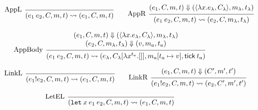 \documentclass[acmsmall,screen,review]{acmart}
\theoremstyle{definition}
\newcommand*{\mem}{m}
\newcommand*{\link}[2]{{#1}\mathtt{!}{#2}}
\newcommand*{\tick}{\mathsf{tick}}
\begin{document}
\begin{figure}[htb]
  \centering
  \footnotesize
  \[
    \begin{prooftree}
      \infer[left label={AppL}]0{
      (e_{1}\:e_{2}, C, \mem, t)
      \rightsquigarrow
      (e_{1},C, \mem,t)
      }
    \end{prooftree}\qquad
    \begin{prooftree}
      \hypo{
        \begin{matrix}
          (e_{1}, C, \mem, t)
          \Downarrow
          (\langle\lambda x.e_{\lambda}, C_{\lambda}\rangle, \mem_{\lambda}, t_{\lambda})
        \end{matrix}
      }
      \infer[left label={AppR}]1{
      (e_{1}\:e_{2}, C, \mem, t)
      \rightsquigarrow
      (e_{2}, C, \mem_{\lambda}, t_{\lambda})
      }
    \end{prooftree}
  \]

  \[
    \begin{prooftree}
      \hypo{
        \begin{matrix}
          (e_{1}, C, \mem, t)
          \Downarrow
          (\langle\lambda x.e_{\lambda}, C_{\lambda}\rangle, \mem_{\lambda}, t_{\lambda}) \\
          (e_{2}, C, \mem_{\lambda}, t_{\lambda})
          \Downarrow
          (v, \mem_{a}, t_{a})
        \end{matrix}
      }
      \infer[left label={AppBody}]1{
      (e_{1}\:e_{2}, C, \mem, t)
      \rightsquigarrow
      (e_{\lambda}, C_{\lambda}[\lambda x^{t_{a}}.[]], \mem_{a}[t_{a}\mapsto v], \tick\:t_{a})
      }
    \end{prooftree}
  \]

  \[
    \begin{prooftree}
      \infer[left label=LinkL]0{
      (\link{e_{1}}{e_{2}}, C, \mem, t)
      \rightsquigarrow
      (e_{1}, C, \mem, t)
      }
    \end{prooftree}\qquad
    \begin{prooftree}
      \hypo{
        \begin{matrix}
          (e_{1}, C, \mem, t)
          \Downarrow
          (C', \mem', t')
        \end{matrix}
      }
      \infer[left label=LinkR]1{
      (\link{e_{1}}{e_{2}}, C, \mem, t)
      \rightsquigarrow
      (e_{2}, C', \mem', t')
      }
    \end{prooftree}
  \]

  \[
    \begin{prooftree}
      \infer[left label=LetEL]0{
      (\mathtt{let}\:x\:e_1\:e_2, C, \mem, t)
      \rightsquigarrow
      (e_{1}, C, \mem, t)
      }
    \end{prooftree}
  \]


\end{figure}
\end{document}
